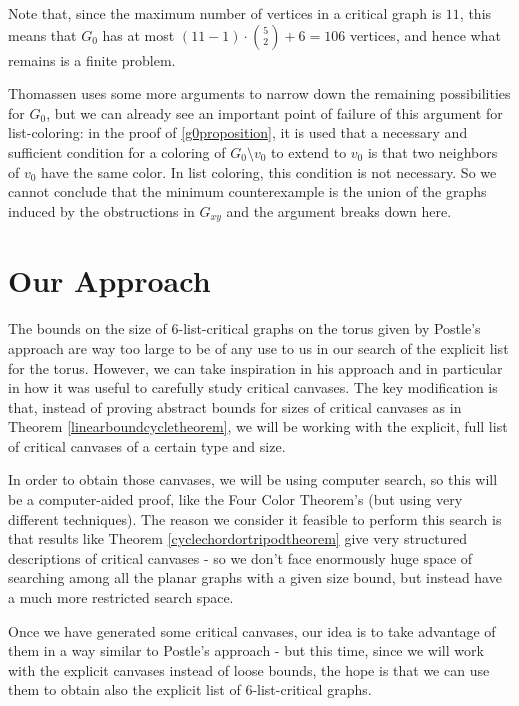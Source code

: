 Note that, since the maximum number of vertices in a critical graph is $11$, this means that
$G_0$ has at most $(11 - 1) \cdot \binom{5}{2} + 6 = 106$ vertices, and hence what remains
is a finite problem.

Thomassen uses some more arguments to narrow down the remaining possibilities for $G_0$, but
we can already see an important point of failure of this argument for list-coloring: in the 
proof of \ref{g0proposition}, it is used that a necessary and sufficient condition for a coloring
of $G_0 \setminus v_0$ to extend to $v_0$ is that two neighbors of $v_0$ have the same color.
In list coloring, this condition is not necessary. So we cannot conclude that the minimum 
counterexample is the union of the graphs induced by the obstructions in $G_{xy}$ and the 
argument breaks down here. 











\section{Our Approach}

The bounds on the size of $6$-list-critical graphs on the torus given by Postle's approach are 
way too large to be of any use to us in our search of the explicit list for the torus. However, 
we can take inspiration in his approach and in particular in how it was useful to carefully study
critical canvases. The key modification is that, instead of proving abstract bounds for sizes
of critical canvases as in Theorem \ref{linearboundcycletheorem}, we will be working with the 
explicit, full list of critical canvases of a certain type and size. 

In order to obtain those canvases, we will be using computer search, so this will be a 
computer-aided proof, like the Four Color Theorem's (but using very different techniques). The 
reason we consider it feasible to perform this search is that results like 
Theorem \ref{cyclechordortripodtheorem} give very structured descriptions of 
critical canvases - so we don't face enormously huge space of searching among
all the planar graphs with a given size bound, but instead have a much more restricted
search space. 

Once we have generated some critical canvases, our idea is to take advantage of them in a way 
similar to Postle's approach - but this time, 
since we will work with the explicit canvases instead of loose bounds, the hope is that we
can use them to obtain also the explicit list of $6$-list-critical graphs. 

